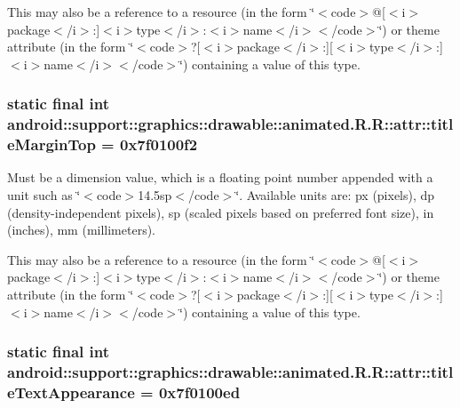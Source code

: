 This may also be a reference to a resource (in the form \char`\"{}$<$code$>$@\mbox{[}$<$i$>$package$<$/i$>$:\mbox{]}$<$i$>$type$<$/i$>$:$<$i$>$name$<$/i$>$$<$/code$>$\char`\"{}) or theme attribute (in the form \char`\"{}$<$code$>$?\mbox{[}$<$i$>$package$<$/i$>$:\mbox{]}\mbox{[}$<$i$>$type$<$/i$>$:\mbox{]}$<$i$>$name$<$/i$>$$<$/code$>$\char`\"{}) containing a value of this type. \hypertarget{classandroid_1_1support_1_1graphics_1_1drawable_1_1animated_1_1_r_1_1attr_043d4f6aed2959f2a8f78d6a2f483721}{
\subsubsection[{titleMarginTop}]{\setlength{\rightskip}{0pt plus 5cm}static final int android::support::graphics::drawable::animated.R.R::attr::titleMarginTop = 0x7f0100f2}}
\label{classandroid_1_1support_1_1graphics_1_1drawable_1_1animated_1_1_r_1_1attr_043d4f6aed2959f2a8f78d6a2f483721}


Must be a dimension value, which is a floating point number appended with a unit such as \char`\"{}$<$code$>$14.5sp$<$/code$>$\char`\"{}. Available units are: px (pixels), dp (density-independent pixels), sp (scaled pixels based on preferred font size), in (inches), mm (millimeters). 

This may also be a reference to a resource (in the form \char`\"{}$<$code$>$@\mbox{[}$<$i$>$package$<$/i$>$:\mbox{]}$<$i$>$type$<$/i$>$:$<$i$>$name$<$/i$>$$<$/code$>$\char`\"{}) or theme attribute (in the form \char`\"{}$<$code$>$?\mbox{[}$<$i$>$package$<$/i$>$:\mbox{]}\mbox{[}$<$i$>$type$<$/i$>$:\mbox{]}$<$i$>$name$<$/i$>$$<$/code$>$\char`\"{}) containing a value of this type. \hypertarget{classandroid_1_1support_1_1graphics_1_1drawable_1_1animated_1_1_r_1_1attr_16746e3d3d5502d1d4839a60f41d1546}{
\subsubsection[{titleTextAppearance}]{\setlength{\rightskip}{0pt plus 5cm}static final int android::support::graphics::drawable::animated.R.R::attr::titleTextAppearance = 0x7f0100ed}}
\label{classandroid_1_1support_1_1graphics_1_1drawable_1_1animated_1_1_r_1_1attr_16746e3d3d5502d1d4839a60f41d1546}


